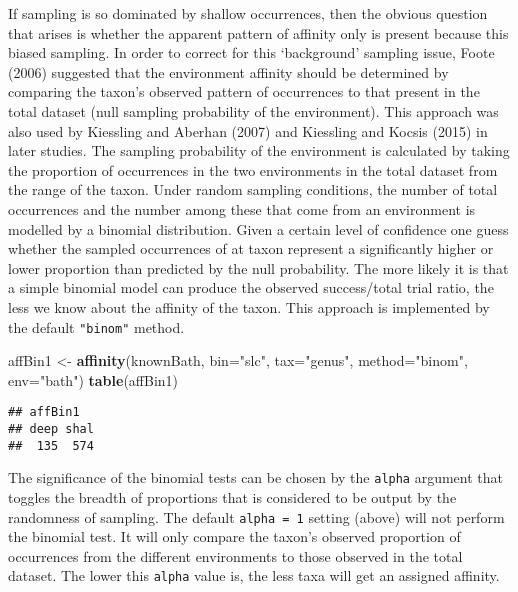 \documentclass[]{article}
\newenvironment{Shaded}{\begin{snugshade}}{\end{snugshade}}
\newcommand{\DataTypeTok}[1]{\textcolor[rgb]{0.13,0.29,0.53}{#1}}
\newcommand{\KeywordTok}[1]{\textcolor[rgb]{0.13,0.29,0.53}{\textbf{#1}}}
\newcommand{\NormalTok}[1]{#1}
\newcommand{\StringTok}[1]{\textcolor[rgb]{0.31,0.60,0.02}{#1}}
\begin{document}
If sampling is so dominated by shallow occurrences, then the obvious
question that arises is whether the apparent pattern of affinity only is
present because this biased sampling. In order to correct for this
`background' sampling issue, Foote (2006) suggested that the environment
affinity should be determined by comparing the taxon's observed pattern
of occurrences to that present in the total dataset (null sampling
probability of the environment). This approach was also used by
Kiessling and Aberhan (2007) and Kiessling and Kocsis (2015) in later
studies. The sampling probability of the environment is calculated by
taking the proportion of occurrences in the two environments in the
total dataset from the range of the taxon. Under random sampling
conditions, the number of total occurrences and the number among these
that come from an environment is modelled by a binomial distribution.
Given a certain level of confidence one guess whether the sampled
occurrences of at taxon represent a significantly higher or lower
proportion than predicted by the null probability. The more likely it is
that a simple binomial model can produce the observed success/total
trial ratio, the less we know about the affinity of the taxon. This
approach is implemented by the default \texttt{"binom"} method.

\begin{Shaded}
\begin{Highlighting}[]
\NormalTok{affBin1 <-}\StringTok{ }\KeywordTok{affinity}\NormalTok{(knownBath, }\DataTypeTok{bin=}\StringTok{"slc"}\NormalTok{, }\DataTypeTok{tax=}\StringTok{"genus"}\NormalTok{, }
  \DataTypeTok{method=}\StringTok{"binom"}\NormalTok{, }\DataTypeTok{env=}\StringTok{"bath"}\NormalTok{)}
\KeywordTok{table}\NormalTok{(affBin1)}
\end{Highlighting}
\end{Shaded}

\begin{verbatim}
## affBin1
## deep shal 
##  135  574
\end{verbatim}

The significance of the binomial tests can be chosen by the
\texttt{alpha} argument that toggles the breadth of proportions that is
considered to be output by the randomness of sampling. The default
\texttt{alpha\ =\ 1} setting (above) will not perform the binomial test.
It will only compare the taxon's observed proportion of occurrences from
the different environments to those observed in the total dataset. The
lower this \texttt{alpha} value is, the less taxa will get an assigned
affinity.
\end{document}
